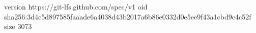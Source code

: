 version https://git-lfs.github.com/spec/v1
oid sha256:3d4c5d897585faaade6a4038d43b2017a6b86e0332d0e5ee9f43a1cbd9c4c52f
size 3073
